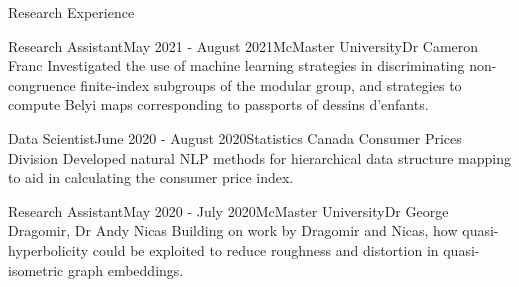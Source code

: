 \begin{rSection}{Research  Experience}



\begin{rSubsection}{Research Assistant}{May 2021 - August 2021}{McMaster University}{Dr Cameron Franc}
	Investigated the use of machine learning strategies in discriminating non-congruence finite-index subgroups of the modular group, and strategies to compute Belyi maps corresponding to passports of dessins d'enfants.
\end{rSubsection}

\begin{rSubsection}{Data Scientist}{June 2020 - August 2020}{Statistics Canada }{Consumer Prices Division}
	Developed natural NLP methods for hierarchical data structure mapping to aid in calculating the consumer price index.
\end{rSubsection}


\begin{rSubsection}{Research Assistant}{May 2020 - July 2020}{McMaster University}{Dr George Dragomir, Dr Andy Nicas}
	Building on work by Dragomir and Nicas, how quasi-hyperbolicity could be exploited to reduce roughness and distortion in quasi-isometric graph embeddings.
\end{rSubsection}




\end{rSection}
